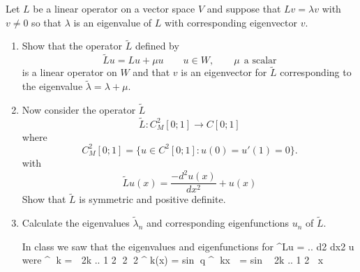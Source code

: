 
Let $L$ be a linear operator on a vector space $V$ and suppose that $Lv=\lambda v$ with $v \neq 0$ so that $\lambda$
is an eigenvalue of $L$ with corresponding eigenvector $v$.
\begin{enumerate}
\item Show that the operator $\tilde{L}$ defined by
\[
\tilde{L}u = Lu + \mu u \qquad u \in W, \qquad \mu \:\: \mbox{a scalar}
\]
is a linear operator on $W$ and that $v$ is an eigenvector for $\tilde{L}$ corresponding to the eigenvalue $\tilde{\lambda}= \lambda + \mu$. 
\item Now consider the operator $\tilde{L}$
\[
\tilde{L} : C^2_M [0; 1] \rightarrow C[0; 1]\]
where
\[
 C^2_M [0; 1] = \{u \in C^2[0; 1] : u(0) = u'(1) = 0\}.
 \]
 with
\[
\tilde{L}u(x) = \frac{-d^2u(x)}{dx^2}+ u(x)
\]
Show that $\tilde{L}$ is symmetric and positive definite.

\item Calculate the eigenvalues $\tilde{\lambda}_n$ and corresponding eigenfunctions $u_n$ of $\tilde{L}.$

In class we saw that the eigenvalues and eigenfunctions for ^Lu = .. d2
dx2 u were
^
k =

2k .. 1
2
2
2
^  k(x) = sin
q
^
kx

= sin

2k .. 1
2

x


\end{enumerate}
